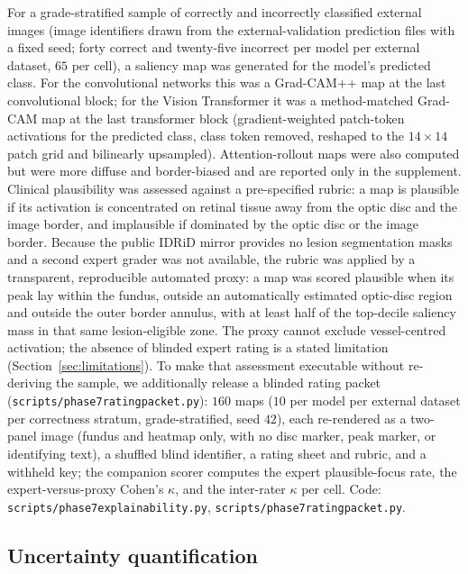 \documentclass[journal]{IEEEtran}
\renewcommand{\_}{\origunderscore\allowbreak}
\begin{document}
For a grade-stratified sample of correctly and incorrectly classified external
images (image identifiers drawn from the external-validation prediction files with
a fixed seed; forty correct and twenty-five incorrect per model per external
dataset, $65$ per cell), a saliency map was generated for the model's predicted
class. For the
convolutional networks this was a Grad-CAM++ map
\cite{chattopadhay2018gradcampp} at the last convolutional block; for the Vision
Transformer it was a method-matched Grad-CAM map at the last transformer block
(gradient-weighted patch-token activations for the predicted class, class token
removed, reshaped to the $14\times14$ patch grid and bilinearly upsampled).
Attention-rollout maps \cite{abnar2020rollout} were also computed but were more
diffuse and border-biased and are reported only in the supplement. Clinical
plausibility was assessed against a pre-specified rubric: a map is plausible if
its activation is concentrated on retinal tissue away from the optic disc and the
image border, and implausible if dominated by the optic disc or the image border.
Because the public IDRiD mirror provides no lesion segmentation masks and a second
expert grader was not available, the rubric was applied by a transparent,
reproducible automated proxy: a map was scored plausible when its peak lay within
the fundus, outside an automatically estimated optic-disc region and outside the
outer border annulus, with at least half of the top-decile saliency mass in that
same lesion-eligible zone. The proxy cannot exclude vessel-centred activation; the
absence of blinded expert rating is a stated limitation
(Section~\ref{sec:limitations}). To make that assessment executable without
re-deriving the sample, we additionally release a blinded rating packet
(\texttt{scripts/\allowbreak{}phase7\_rating\_packet.py}): $160$ maps ($10$ per model per
external dataset per correctness stratum, grade-stratified, seed $42$), each
re-rendered as a two-panel image (fundus and heatmap only, with no disc marker,
peak marker, or identifying text), a shuffled blind identifier, a rating sheet
and rubric, and a withheld key; the companion scorer computes the expert
plausible-focus rate, the expert-versus-proxy Cohen's $\kappa$, and the
inter-rater $\kappa$ per cell. Code:
\texttt{scripts/\allowbreak{}phase7\_explainability.py},
\texttt{scripts/\allowbreak{}phase7\_rating\_packet.py}.

\subsection{Uncertainty quantification}
\label{sec:methods-unc}
\end{document}
